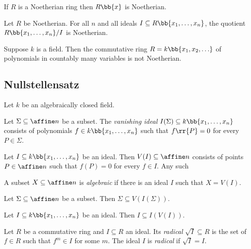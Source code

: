 \documentclass{article}
\begin{document}
\begin{theorem}[Hilbert]
  If $R$ is a Noetherian ring then $R\bb{x}$ is Noetherian.
\end{theorem}

\begin{corollary}
  Let $R$ be Noetherian. For all $n$ and all ideals $I\subseteq R\bb{x_1,\ldots,x_n}$,
  the quotient $R\bb{x_1,\ldots,x_n}/I$ is Noetherian.
\end{corollary}

\begin{proposition}
  Suppose $k$ is a field. Then the commutative ring $R=k\bb{x_1,x_2,\ldots}$ of polynomials
  in countably many variables is not Noetherian.
\end{proposition}

\subsection{Nullstellensatz}

Let $k$ be an algebraically closed field.

\begin{definition}
  Let $\Sigma\subseteq\affine n$ be a subset. The \emph{vanishing ideal}
  $I(\Sigma)\subseteq k\bb{x_1,\ldots,x_n}$ consists of polynomials
  $f\in k\bb{x_1,\ldots,x_n}$ such that $f\rr{P}=0$ for every $P\in\Sigma$.
\end{definition}

\begin{definition}
  Let $I\subseteq k\bb{x_1,\ldots,x_n}$ be an ideal. Then $V(I)\subseteq\affine n$
  consists of points $P\in\affine n$ such that $f(P)=0$ for every $f\in I$. Any such

  A subset $X\subseteq\affine n$ is \emph{algebraic} if there is an ideal $I$ such that
  $X=V(I)$.
\end{definition}

\begin{lemma}
  Let $\Sigma\subseteq\affine n$ be a subset. Then $\Sigma\subseteq V(I(\Sigma))$.
\end{lemma}

\begin{lemma}
  Let $I\subseteq k\bb{x_1,\ldots,x_n}$ be an ideal. Then $I\subseteq I(V(I))$.
\end{lemma}

\begin{definition}
  Let $R$ be a commutative ring and $I\subseteq R$ an ideal. Its \emph{radical}
  $\sqrt{I}\subseteq R$ is the set of $f\in R$ such that $f^m \in I$ for some
  $m$. The ideal $I$ is \emph{radical} if $\sqrt{I}=I$.
\end{definition}
\end{document}
